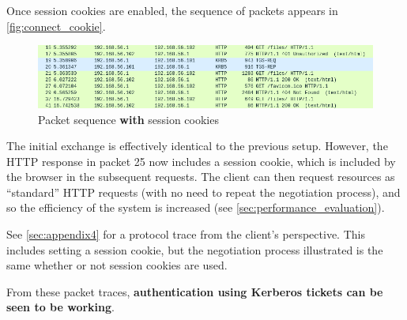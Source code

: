 \documentclass[12pt]{report}
\begin{document}
Once session cookies are enabled, the sequence of packets appears in \autoref{fig:connect_cookie}.

\begin{figure}[h]
  \begin{center}
    \includegraphics[width=\textwidth]{10-connect-cookie.png}
  \end{center}
  \caption{Packet sequence \textbf{with} session cookies}
  \label{fig:connect_cookie}
\end{figure}

The initial exchange is effectively identical to the previous setup. However, the HTTP response in packet 25 now includes a session cookie, which is included by the browser in the subsequent requests. The client can then request resources as ``standard'' HTTP requests (with no need to repeat the negotiation process), and so the efficiency of the system is increased (see \autoref{sec:performance_evaluation}).

See \autoref{sec:appendix4} for a protocol trace from the client's perspective. This includes setting a session cookie, but the negotiation process illustrated is the same whether or not session cookies are used.

From these packet traces, \textbf{authentication using Kerberos tickets can be seen to be working}.
\end{document}
